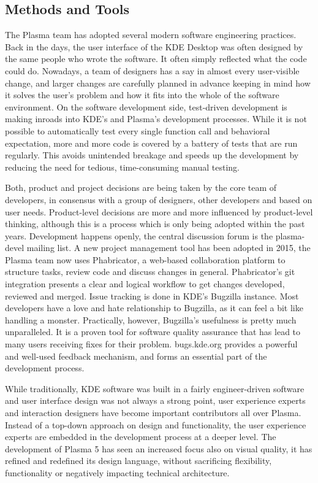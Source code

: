 \subsection*{Methods and Tools}

The Plasma team has adopted several modern software engineering practices. Back in the days, the user interface of the KDE Desktop was often designed by the same people who wrote the software. It often simply reflected what the code could do. Nowadays, a team of designers has a say in almost every user-visible change, and larger changes are carefully planned in advance keeping in mind how it solves the user's problem and how it fits into the whole of the software environment.
On the software development side, test-driven development is making inroads into KDE's and Plasma's development processes. While it is not possible to automatically test every single function call and behavioral expectation, more and more code is covered by a battery of tests that are run regularly. This avoids unintended breakage and speeds up the development by reducing the need for tedious, time-consuming manual testing.

Both, product and project decisions are being taken by the core team of developers, in consensus with a group of designers, other developers and based on user needs. Product-level decisions are more and more influenced by product-level thinking, although this is a process which is only being adopted within the past years.
Development happens openly, the central discussion forum is the plasma-devel mailing list. A new project management tool has been adopted in 2015, the Plasma team now uses Phabricator, a web-based collaboration platform to structure tasks, review code and discuss changes in general. Phabricator's git integration presents a clear and logical workflow to get changes developed, reviewed and merged.
Issue tracking is done in KDE's Bugzilla instance. Most developers have a love and hate relationship to Bugzilla, as it can feel a bit like handling a monster. Practically, however, Bugzilla's usefulness is pretty much unparalleled. It is a proven tool for software quality assurance that has lead to many users receiving fixes for their problem. bugs.kde.org provides a powerful and well-used feedback mechanism, and forms an essential part of the development process.

While traditionally, KDE software was built in a fairly engineer-driven software and user interface design was not always a strong point, user experience experts and interaction designers have become important contributors all over Plasma. Instead of a top-down approach on design and functionality, the user experience experts are embedded in the development process at a deeper level. The development of Plasma 5 has seen an increased focus also on visual quality, it has refined and redefined its design language, without sacrificing flexibility, functionality or negatively impacting technical architecture.

